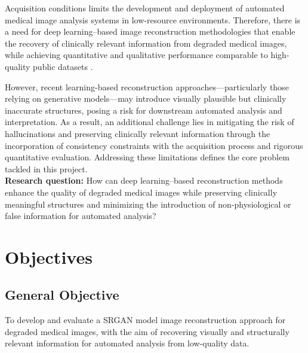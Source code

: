 \documentclass[12pt,letterpaper]{article}     %
\begin{document}
\noindent Acquisition conditions limits the development and deployment of automated medical image analysis systems in low-resource environments. Therefore, there is a need for deep learning–based image reconstruction methodologies that enable the recovery of clinically relevant information from degraded medical images, while achieving quantitative and qualitative performance comparable to high-quality public datasets \cite{radiology}.

\noindent However, recent learning-based reconstruction approaches—particularly those relying on generative models—may introduce visually plausible but clinically inaccurate structures, posing a risk for downstream automated analysis and interpretation. As a result, an additional challenge lies in mitigating the risk of hallucinations and preserving clinically relevant information through the incorporation of consistency constraints with the acquisition process and rigorous quantitative evaluation. Addressing these limitations defines the core problem tackled in this project.\\


\noindent \textbf{Research question:} How can deep learning–based reconstruction methods enhance the quality of degraded medical images while preserving clinically meaningful structures and minimizing the introduction of non-physiological or false information for automated analysis?





\section{Objectives}

\subsection{General Objective}
To develop and evaluate a SRGAN model image reconstruction approach for degraded medical images, with the aim of recovering visually and structurally relevant information for automated analysis from low-quality data.
\end{document}
